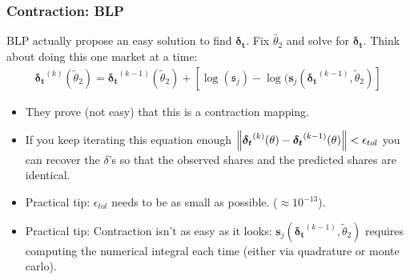\begin{frame}
\frametitle{Contraction: BLP}
BLP actually propose an easy solution to find $\boldsymbol{\delta_t}$. Fix $\widetilde{\theta_2}$ and solve for $\boldsymbol{\delta_t}$. Think about doing this one market at a time:
\begin{align*}
\boldsymbol{\delta_t}^{(k)}(\widetilde{\theta}_2) = \boldsymbol{\delta_t}^{(k-1)}(\widetilde{\theta}_2) + \left[ \log(\boldsymbol{\mathfrak{s}}_{j}) - \log(\boldsymbol{s}_{j}(\boldsymbol{\delta_t}^{(k-1)}, \widetilde{\theta}_2) \right]
\end{align*}
 \begin{itemize}
 \item They prove (not easy) that this is a \alert{contraction mapping}.
 \item If you keep iterating this equation enough $\left\lVert\boldsymbol{\delta_{t}}^{(k)}(\theta) - \boldsymbol{\delta_{t}}^{(k-1)}(\theta)\right\rVert < \epsilon_{tol}$ you can recover the $\delta$'s so that the observed shares and the predicted shares are identical.
 \item Practical tip: $\epsilon_{tol}$ needs to be as small as possible. ($\approx 10^{-13}$).
 \item Practical tip: Contraction isn't as easy as it looks:  $\boldsymbol{s}_{j}(\boldsymbol{\delta_t}^{(k-1)}, \widetilde{\theta}_2)$ requires computing the numerical integral each time (either via quadrature or monte carlo).
  \end{itemize}
 \end{frame}
 

